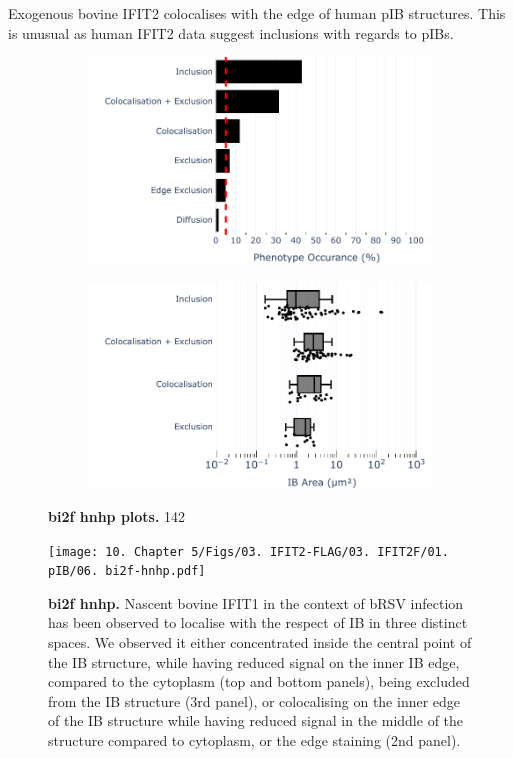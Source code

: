 Exogenous bovine IFIT2 colocalises with the edge of human pIB structures. This is unusual as human IFIT2 data suggest inclusions with regards to pIBs.

\begin{figure}
    \begin{subfigure}{0.495\textwidth}
        \caption{}
        \includegraphics[width=1\linewidth]{10. Chapter 5/Figs/03. IFIT2-FLAG/03. IFIT2F/01. pIB/04. bar_bi2f_hnhp.pdf} 
    \end{subfigure}
    \begin{subfigure}{0.495\textwidth}
        \caption{}
        \includegraphics[width=1\linewidth]{10. Chapter 5/Figs/03. IFIT2-FLAG/03. IFIT2F/01. pIB/05. box_bi2f_hnhp.pdf}
    \end{subfigure}
    \caption[bi2f hnhp plots]{\textbf{bi2f hnhp plots.} 142}
    \label{fig:bi2f hnhp plots}
\end{figure}

\begin{figure}
    \centering
    \texttt{[image: 10. Chapter 5/Figs/03. IFIT2-FLAG/03. IFIT2F/01. pIB/06. bi2f-hnhp.pdf]}
    \caption[bi2f hnhp]{\textbf{bi2f hnhp.} Nascent bovine IFIT1 in the context of bRSV infection has been observed to localise with the respect of IB in three distinct spaces. We observed it either concentrated inside the central point of the IB structure, while having reduced signal on the inner IB edge, compared to the cytoplasm (top and bottom panels), being excluded from the IB structure (3rd panel), or colocalising on the inner edge of the IB structure while having reduced signal in the middle of the structure compared to cytoplasm, or the edge staining (2nd panel).}
    \label{fig:bi2f hnhp}
\end{figure}

